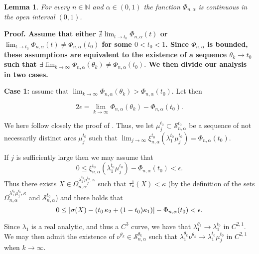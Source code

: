 \documentclass{article}
\def\proof{\noindent \bf Proof. \rm}
\newtheorem{lemma}{Lemma}[section]
\begin{document}
\begin{lemma}\label{lcon1} For every $n\in \mathbb N$ and $\alpha\in (0,1)$ the function $\Phi_{n,\alpha}$ is continuous in the open interval $(0,1)$.
\end{lemma}

\proof Assume that either $ \nexists\lim_{t\to t_0}\Phi_{n,\alpha}(t)$ or $\lim_{t\to t_0}\Phi_{n,\alpha}(t)\neq\Phi_{n,\alpha}(t_0)$
for some $0<t_0<1$. Since $\Phi_{n,\alpha}$ is bounded, these assumptions are equivalent to the existence of a sequence $\theta_k\to t_0$ such that  $\exists \lim_{k\to\infty}\Phi_{n,\alpha}(\theta_k)\neq\Phi_{n,\alpha}(t_0).$ 
We then divide our analysis in two cases.\medskip

\noindent
{\bf Case 1:} assume that $\lim_{k\to\infty}\Phi_{n,\alpha}(\theta_k)>\Phi_{n,\alpha}(t_0).$
Let then 

\begin{equation}\label{eep}
2\epsilon=\lim_{k\to \infty}\Phi_{n,\alpha}(\theta_k)-\Phi_{n,\alpha}(t_0).
\end{equation}


 We here follow closely the proof of \cite[Lem 4.3]{p1}. Thus, 
we let $\mu_j^{t_0}\subset \mathcal{S}_{n,\alpha}^{t_0}$ be a sequence  of not necessarily distinct arcs $\mu_j^{t_0}$ such that $\lim_{j\to\infty}\xi_{n,\alpha}^{t_0}(\lambda_1^{t_0}\mu_j^{t_0})=\Phi_{n,\alpha}(t_0)$. 

If $j$ is sufficiently large then we may assume that $$0\leq \xi_{n,\alpha}^{t_0} (\lambda_1^{t_0}\mu_j^{t_0})-\Phi_{n,\alpha}(t_0)<\epsilon.$$ Thus there exists 
$X\in \Omega^{\lambda_1^{t_0}\mu^{t_0}_j,\kappa}_{n,\alpha}$ such that $\tau_*^1(X)<\kappa$ 
(by the definition of the sets $\Omega^{\lambda_1^{t_0}\mu^{t_0}_j,\kappa}_{n,\alpha}$ and 
$\mathcal S_{n,\alpha}^{t_0}$\hspace{.02in}) and there holds that
\begin{equation}\label{ineq1}
0\leq |\sigma(X)-
(t_0\hspace{.02in}\kappa_2+(1-t_0)\kappa_1)|-\Phi_{n,\alpha}(t_0)<\epsilon.
\end{equation}

Since $\lambda_1$ is a real analytic, and thus a $C^3$ curve, we have that
$\lambda_1^{\theta_k}\to\lambda_1^{t_0}$ in $C^{2,1}$. We may then admit  
the existence of  $\nu^{\theta_k}\in \mathcal{S}_{n,\alpha}^{\theta_k}$ such that 
$\lambda_1^{\theta_k}\nu^{\theta_k}\to \lambda_1^{t_0}\mu_j^{t_0}$ in $C^{2,1}$  when $k\to \infty$. 
\end{document}

